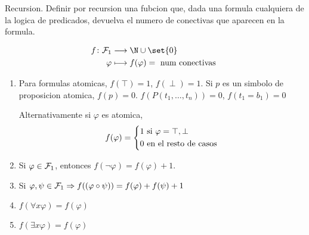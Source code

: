 \begin{example}
	Recursion. Definir por recursion una fubcion que, dada una formula cualquiera de la logica de predicados, devuelva el numero de conectivas que aparecen en la formula.

	\[
		\begin{aligned}
			f \colon \mathcal{\MakeUppercase{f}}_1 & \longrightarrow \N \cup \set{0}                   \\
			\varphi                                & \longmapsto f (\varphi) = \text{ num conectivas }
		\end{aligned}
	\]

	\begin{enumerate}
		\item Para formulas atomicas, \(f(\top) = 1 \), \(f(\perp) = 1\). Si \(p \) es un simbolo de proposicion atomica, \(f(p) = 0\). \(f(P(t_1,\ldots,t_n)) = 0 \), \(f(t_1 = b_1) = 0 \)

		      Alternativamente si \(\varphi\) es atomica,
		      \[
			      f(\varphi) = \begin{dcases}
				      1 \text{ si } \varphi = \top, \perp \\
				      0 \text{ en el resto de casos}
			      \end{dcases}
		      \]
		\item Si \(\varphi \in \mathcal{\MakeUppercase{f}}_1 \), entonces \(f(\neg \varphi) = f(\varphi) + 1 \).
		\item Si \(\varphi,\psi \in \mathcal{\MakeUppercase{f}}_1 \Rightarrow f((\varphi \circ \psi)) = f(\varphi) + f(\psi) + 1 \)
		\item \(f(\forall x \varphi) = f(\varphi)\)
		\item \(f(\exists x \varphi) = f(\varphi)\)
	\end{enumerate}
\end{example}

